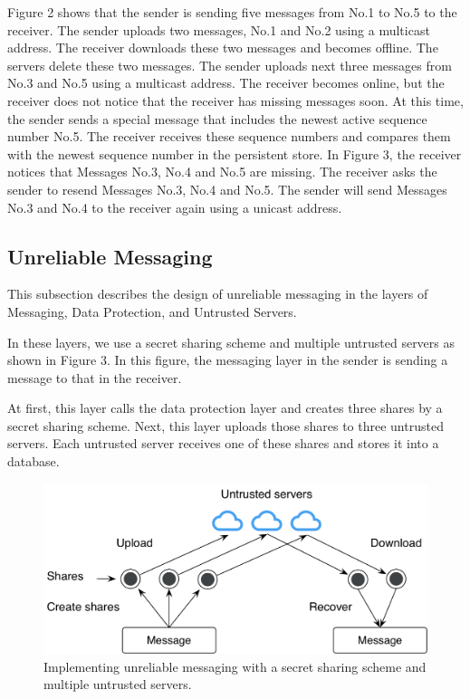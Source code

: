 \documentclass[twocolumn,10pt]{article}
\begin{document}
Figure 2 shows that the sender is sending five messages from No.1 to No.5 to the receiver.
The sender uploads two messages, No.1 and No.2 using a multicast address.
The receiver downloads these two messages and becomes offline.
The servers delete these two messages.
The sender uploads next three messages from No.3 and No.5  using a multicast address.
The receiver becomes online, but the receiver does not notice that the receiver has missing messages soon.
At this time, the sender sends a special message that includes the newest active sequence number No.5.
The receiver receives these sequence numbers and compares them with the newest sequence number in the persistent store.
In Figure 3, the receiver notices that Messages No.3, No.4 and No.5 are missing.
The receiver asks the sender to resend Messages No.3, No.4 and No.5.
The sender will send Messages No.3 and No.4 to the receiver again using a unicast address.

\subsection{Unreliable Messaging}

This subsection describes the design of unreliable messaging in the layers of Messaging, Data Protection, and Untrusted Servers.

In these layers, we use a secret sharing scheme and multiple untrusted servers as shown in Figure 3.
In this figure, the messaging layer in the sender is sending a message to that in the receiver.

At first, this layer calls the data protection layer and creates three shares by a secret sharing scheme.
Next, this layer uploads those shares to three untrusted servers.
Each untrusted server receives one of these shares and stores it into a database.

\begin{figure}[t]
	\centering
	\includegraphics[scale=0.42]{sync_flow}
	\caption{Implementing unreliable messaging with a secret sharing scheme and multiple untrusted servers.}
\end{figure}
\end{document}
